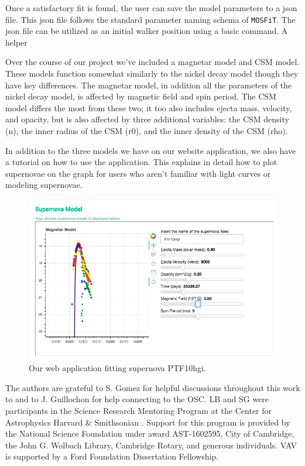 \documentclass[RNAAS]{aastex62}
\begin{document}
Once a satisfactory fit is found, the user can save the model parameters to a json file. This json file follows the standard parameter naming schema of {\tt MOSFiT}. The json file can be utilized as an initial walker position using a basic command. A helper

Over the course of our project we've included a magnetar model and CSM model. These models function somewhat similarly to the nickel decay model though they have key differences. The magnetar model, in addition all the parameters of the nickel decay model, is affected by magnetic field and spin period. The CSM model differs the most from these two; it too also includes ejecta mass, velocity, and opacity, but is also affected by three additional variables: the CSM density (n), the inner radius of the CSM (r0), and the inner density of the CSM (rho).


In addition to the three models we have on our website application, we also have a tutorial on how to use the application. This explains in detail how to plot supernovae on the graph for users who aren't familiar with light curves or modeling supernovae.



\begin{figure}[h!]
\begin{center}
\includegraphics[scale=0.65,angle=0]{modeled.png}
\caption{Our web application fitting supernova PTF10hgi. \label{fig:1}}
\end{center}
\end{figure}

\acknowledgments

The authors are grateful to S. Gomez for helpful discussions throughout this work to and to J. Guillochon for help connecting to the OSC. LB and SG were participants in the Science Research Mentoring Program at the Center for Astrophysics \textbar{} Harvard \& Smithsonian \citep{2018arXiv180908078G}. Support for this program is provided by the National Science Foundation under award AST-1602595, City of Cambridge, the John G. Wolbach Library, Cambridge Rotary, and generous individuals. VAV is supported by a Ford Foundation Dissertation Fellowship.


\end{document}
